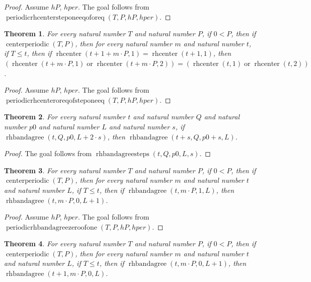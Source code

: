 \documentclass[11pt]{article}
\newtheorem{theorem}{Theorem}[section]
\theoremstyle{definition}
\begin{document}
\begin{proof}
Assume \(hP\), \(hper\).
The goal follows from \(\operatorname{periodicrhcentersteponeeqoforeq}(T, P, hP, hper)\).
\end{proof}
\begin{theorem}
\label{ll:paper:periodic-rhcenter-or-eq-of-step-one-eq}
For every natural number \(T\) and natural number \(P\), if \(0 < P\), then if \(\operatorname{centerperiodic}(T, P)\), then for every natural number \(m\) and natural number \(t\), if \(T \le t\), then if \(\operatorname{rhcenter}(t + 1 + m \cdot P, 1) = \operatorname{rhcenter}(t + 1, 1)\), then \((\operatorname{rhcenter}(t + m \cdot P, 1) \operatorname{or} \operatorname{rhcenter}(t + m \cdot P, 2)) = (\operatorname{rhcenter}(t, 1) \operatorname{or} \operatorname{rhcenter}(t, 2))\).
\end{theorem}
\begin{proof}
Assume \(hP\), \(hper\).
The goal follows from \(\operatorname{periodicrhcenteroreqofsteponeeq}(T, P, hP, hper)\).
\end{proof}
\begin{theorem}
\label{ll:paper:rhbandagree-steps}
For every natural number \(t\) and natural number \(Q\) and natural number \(p0\) and natural number \(L\) and natural number \(s\), if \(\operatorname{rhbandagree}(t, Q, p0, L + 2 \cdot s)\), then \(\operatorname{rhbandagree}(t + s, Q, p0 + s, L)\).
\end{theorem}
\begin{proof}
The goal follows from \(\operatorname{rhbandagreesteps}(t, Q, p0, L, s)\).
\end{proof}
\begin{theorem}
\label{ll:paper:periodic-rhbandagree-zero-of-one}
For every natural number \(T\) and natural number \(P\), if \(0 < P\), then if \(\operatorname{centerperiodic}(T, P)\), then for every natural number \(m\) and natural number \(t\) and natural number \(L\), if \(T \le t\), then if \(\operatorname{rhbandagree}(t, m \cdot P, 1, L)\), then \(\operatorname{rhbandagree}(t, m \cdot P, 0, L + 1)\).
\end{theorem}
\begin{proof}
Assume \(hP\), \(hper\).
The goal follows from \(\operatorname{periodicrhbandagreezeroofone}(T, P, hP, hper)\).
\end{proof}
\begin{theorem}
\label{ll:paper:periodic-rhbandagree-zero-step}
For every natural number \(T\) and natural number \(P\), if \(0 < P\), then if \(\operatorname{centerperiodic}(T, P)\), then for every natural number \(m\) and natural number \(t\) and natural number \(L\), if \(T \le t\), then if \(\operatorname{rhbandagree}(t, m \cdot P, 0, L + 1)\), then \(\operatorname{rhbandagree}(t + 1, m \cdot P, 0, L)\).
\end{theorem}
\end{document}
